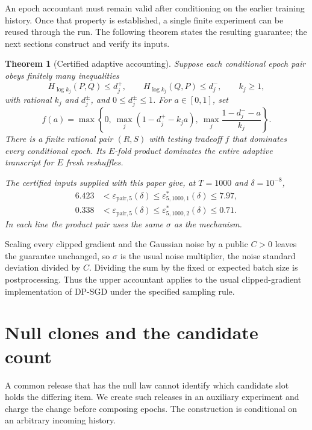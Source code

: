 \documentclass[conference]{IEEEtran}
\newtheorem{theorem}{Theorem}
\newcommand{\eps}{\varepsilon}
\newcommand{\pair}{\mathrm{pair}}
\begin{document}
An epoch accountant must remain valid after conditioning on the earlier training history. Once that property is established, a single finite experiment can be reused through the run. The following theorem states the resulting guarantee; the next sections construct and verify its inputs.

\begin{theorem}[Certified adaptive accounting]\label{thm:main}
Suppose each conditional epoch pair obeys finitely many inequalities
\[
 H_{\log k_j}(P,Q)\le d_j^+,\qquad
 H_{\log k_j}(Q,P)\le d_j^-,\qquad k_j\ge1,
\]
with rational $k_j$ and $d_j^\pm$, and $0\le d_j^\pm\le1$. For $a\in[0,1]$, set
\begin{equation}\label{eq:envelope}
 f(a)=\max\left\{0,\ \max_j(1-d_j^+-k_ja),\
                    \max_j\frac{1-d_j^- -a}{k_j}\right\}.
\end{equation}
There is a finite rational pair $(R,S)$ with testing tradeoff $f$ that dominates every conditional epoch. Its $E$-fold product dominates the entire adaptive transcript for $E$ fresh reshuffles.

The certified inputs supplied with this paper give, at $T=1000$ and $\delta=10^{-8}$,
\begin{align*}
 6.423&<\eps_{\pair,5}(\delta)\le\eps^*_{5,1000,1}(\delta)\le7.97,\\
 0.338&<\eps_{\pair,5}(\delta)\le\eps^*_{5,1000,2}(\delta)\le0.71.
\end{align*}
In each line the product pair uses the same $\sigma$ as the mechanism.
\end{theorem}

Scaling every clipped gradient and the Gaussian noise by a public $C>0$ leaves the guarantee unchanged, so $\sigma$ is the usual noise multiplier, the noise standard deviation divided by $C$. Dividing the sum by the fixed or expected batch size is postprocessing. Thus the upper accountant applies to the usual clipped-gradient implementation of DP-SGD under the specified sampling rule.

\section{Null clones and the candidate count}\label{sec:clone}
A common release that has the null law cannot identify which candidate slot holds the differing item. We create such releases in an auxiliary experiment and charge the change before composing epochs. The construction is conditional on an arbitrary incoming history.
\end{document}
